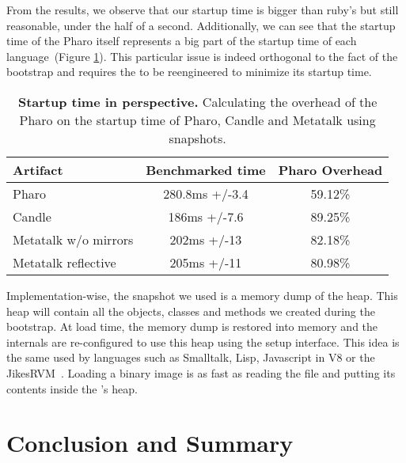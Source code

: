 From the results, we observe that our startup time is bigger than ruby's but still reasonable, under the half of a second. Additionally, we can see that the startup time of the Pharo \VM itself represents a big part of the startup time of each language~(Figure \ref{tb:startup_overhead}). This particular issue is indeed orthogonal to the fact of the bootstrap and requires the \VM to be reengineered to minimize its startup time.
 
 \begin{table}[ht]
 	\centering
 	\begin{tabular}{lcc}
			\toprule
			\textbf{Artifact}
			& \textbf{Benchmarked time}
 			& \textbf{Pharo \VM Overhead}\\
		\toprule
		Pharo & 280.8ms +/-3.4 & 59.12\% \\\midrule
		Candle & 186ms +/-7.6 & 89.25\% \\\midrule
		Metatalk w/o mirrors &202ms +/-13 & 82.18\% \\\midrule
		Metatalk reflective &205ms +/-11 & 80.98\% \\\bottomrule
 	\end{tabular}
	\vspace*{0.2cm}
 	\caption{\small\textbf{Startup time in perspective.} Calculating the overhead of the Pharo \VM on the startup time of Pharo, Candle and Metatalk using snapshots.\label{tb:startup_overhead}}
 \end{table}
 
 

Implementation-wise, the snapshot we used is a memory dump of the \VM heap. This heap will contain all the objects, classes and methods we created during the bootstrap. At load time, the memory dump is restored into memory and the \VM internals are re-configured to use this heap using the \VM setup interface. This idea is the same used by languages such as Smalltalk, Lisp, Javascript in V8 or the JikesRVM~\cite{Alpe00a}. Loading a binary image is as fast as reading the file and putting its contents inside the \VM's heap.

\section{Conclusion and Summary}



